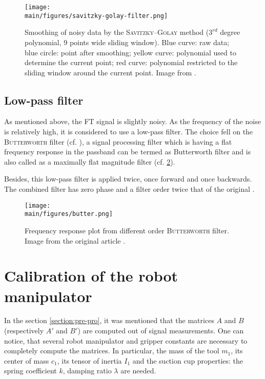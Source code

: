\documentclass[/home/francois/latex/report/main.tex]{subfiles}
\begin{document}
\begin{figure}[h]
  \centering
  \texttt{[image: \\main/figures/savitzky-golay-filter.png]}
  \caption{Smoothing of noisy data by the \textsc{Savitzky–Golay} method ($3^{rd}$ degree polynomial, 9 points wide sliding window). Blue curve: raw data; blue circle: point after smoothing; yellow curve: polynomial used to determine the current point; red curve: polynomial restricted to the sliding window around the current point. Image from \cite{Cdang2013}.}
  \label{fig:method:savit}
\end{figure}

\subsection{Low-pass filter}

As mentioned above, the \ac{FT} signal is slightly noisy. As the frequency of the noise is relatively high, it is considered to use a low-pass filter. The choice fell on the \textsc{Butterworth} filter (cf. \cite{filter1923}), a signal processing filter which is having a flat frequency response in the passband can be termed as Butterworth filter and is also called as a maximally flat magnitude filter (cf. \ref{fig:method:butter}).

Besides, this low-pass filter is applied twice, once forward and once backwards. The combined filter has zero phase and a filter order twice that of the original \cite{SciPy2019}.

\begin{figure}[h]
  \centering
  \texttt{[image: \\main/figures/butter.png]}
  \caption{Frequency response plot from different order \textsc{Butterworth} filter. Image from the original article  \cite{filter1923}.}
  \label{fig:method:butter}
\end{figure}

\section{Calibration of the robot manipulator}

In the section \ref{section:pre-pro}, it was mentioned that the matrices $A$ and $B$ (respectively $A'$ and $B'$) are computed out of signal measurements. One can notice, that several robot manipulator and gripper constants are necessary to completely compute the matrices. In particular, the mass of the tool $m_1$, its center of mass $c_1$, its tensor of inertia $I_1$ and the suction cup properties: the spring coefficient $k$, damping ratio $\lambda$ are needed.
\end{document}
